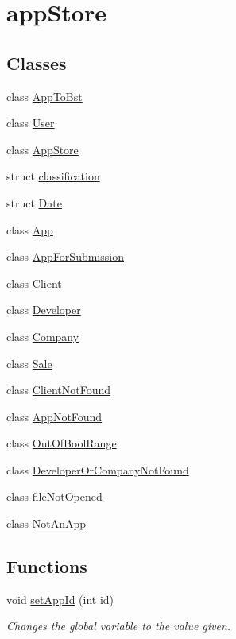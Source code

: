 \hypertarget{group__app_store}{\section{app\-Store}
\label{group__app_store}
}
\subsection*{Classes}
\begin{DoxyCompactItemize}
\item 
class \hyperlink{class_app_to_bst}{App\-To\-Bst}
\item 
class \hyperlink{class_user}{User}
\item 
class \hyperlink{class_app_store}{App\-Store}
\item 
struct \hyperlink{structclassification}{classification}
\item 
struct \hyperlink{struct_date}{Date}
\item 
class \hyperlink{class_app}{App}
\item 
class \hyperlink{class_app_for_submission}{App\-For\-Submission}
\item 
class \hyperlink{class_client}{Client}
\item 
class \hyperlink{class_developer}{Developer}
\item 
class \hyperlink{class_company}{Company}
\item 
class \hyperlink{class_sale}{Sale}
\item 
class \hyperlink{class_client_not_found}{Client\-Not\-Found}
\item 
class \hyperlink{class_app_not_found}{App\-Not\-Found}
\item 
class \hyperlink{class_out_of_bool_range}{Out\-Of\-Bool\-Range}
\item 
class \hyperlink{class_developer_or_company_not_found}{Developer\-Or\-Company\-Not\-Found}
\item 
class \hyperlink{classfile_not_opened}{file\-Not\-Opened}
\item 
class \hyperlink{class_not_an_app}{Not\-An\-App}
\end{DoxyCompactItemize}
\subsection*{Functions}
\begin{DoxyCompactItemize}
\item 
void \hyperlink{group__app_store_ga6fba59196281e80b93a79f7941f55cb8}{set\-App\-Id} (int id)
\begin{DoxyCompactList}\small\item\em Changes the global variable to the value given. \end{DoxyCompactList}\end{DoxyCompactItemize}


